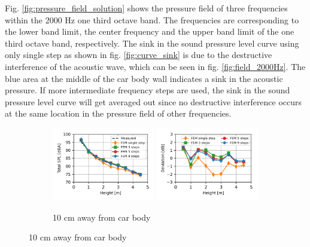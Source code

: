 Fig. \ref{fig:pressure_field_solution} shows the pressure field of three frequencies within the 2000 Hz one third octave band. The frequencies are corresponding to the lower band limit, the center frequency and the upper band limit of the one third octave band, respectively. The sink in the sound pressure level curve using only single step as shown in fig. \ref{fig:curve_sink} is due to the destructive interference of the acoustic wave, which can be seen in fig. \ref{fig:field_2000Hz}. The blue area at the middle of the car body wall indicates a sink in the acoustic pressure. If more intermediate frequency steps are used, the sink in the sound pressure level curve will get averaged out since no destructive interference occurs at the same location in the pressure field of other frequencies.

\begin{figure}[H]
	\begin{subfigure}[b]{\textwidth}
		\centering
		\includegraphics[width=0.49\textwidth]{fig/chap5/freq_steps/overall_SPL/pos_a.png}
		\includegraphics[width=0.49\textwidth]{fig/chap5/freq_steps/overall_SPL/pos_a_deviation.png}
		\caption{10 cm away from car body}
	\end{subfigure}
\end{figure}
